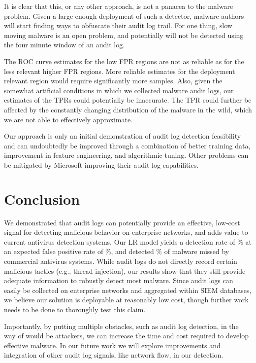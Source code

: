\documentclass{sig-alternate-2013}
\newcommand{\eg}{e.g.\xspace}
\begin{document}
It is clear that this, or any other approach, is not a panacea to the malware problem. Given a large enough deployment of such a detector, malware authors will start finding ways to obfuscate their audit log trail. For one thing, slow moving malware is an open problem, and potentially will not be detected using the four minute window of an audit log. 

The ROC curve estimates for the low FPR regions are not as reliable as for the less relevant higher FPR regions. More reliable estimates for the deployment relevant region would require significantly more samples. Also, given the somewhat artificial conditions in which we collected malware audit logs, our estimates of the TPRs could potentially be inaccurate. The TPR could further be affected by the constantly changing distribution of the malware in the wild, which we are not able to effectively approximate.

Our approach is only an initial demonstration of audit log detection feasibility and can undoubtedly be improved through a combination of better training data, improvement in feature engineering, and algorithmic tuning. Other problems can be mitigated by Microsoft improving their audit log capabilities. 

\section{Conclusion}
\label{sec:conclusion}

We demonstrated that audit logs can potentially provide an effective, low-cost signal for detecting malicious behavior on enterprise networks, and adds value to current antivirus detection systems. Our LR model yields a detection rate of \% at an expected false positive rate of \%, and detected \% of malware missed by commercial antivirus systems. While audit logs do not directly record certain malicious tactics (\eg, thread injection), our results show that they still provide adequate information to robustly detect most malware. Since audit logs can easily be collected on enterprise networks and aggregated within SIEM databases, we believe our solution is deployable at reasonably low cost, though further work needs to be done to thoroughly test this claim.

Importantly, by putting multiple obstacles, such as audit log detection, in the way of would be attackers, we can increase the time and cost required to develop effective malware. In our future work we will explore improvements and integration of other audit log signals, like network flow, in our detection.
\end{document}
